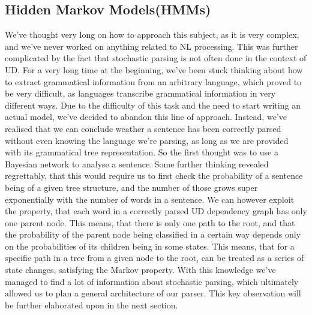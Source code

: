 \subsection{Hidden Markov Models(HMMs)}
We've thought very long on
how to approach this subject, as it is very complex, and we've never worked on anything related to NL processing. This was further
complicated by the fact that stochastic parsing is not often done in the context of UD. For a very long time at the beginning, we've been stuck thinking about how to
extract grammatical information from an arbitrary language, which proved to be very difficult, as languages transcribe grammatical information
in very different ways. Due to the difficulty of this task and the need to start writing an actual model, we've decided to abandon this line of approach.
Instead, we've realised that we can conclude weather a sentence has been correctly parsed without even knowing the language we're parsing, as long as we
are provided with its grammatical tree representation. So the first thought was to use a Bayesian network to analyse a sentence. Some further thinking revealed
regrettably, that this would require us to first check the probability of a sentence being of a given tree structure, and the number of those grows super exponentially
with the number of words in a sentence. We can however exploit the property, that each word in a correctly parsed UD dependency graph has only one parent node. This means, that there is only one path to the root, and that the probability of the parent node being classified in a certain way depends only on the probabilities of its children being in some states. This means, that for a specific path in a tree from a given node to the root, can be treated as a series of state changes, satisfying the Markov property. With this knowledge we've managed to find a lot of information about stochastic parsing, which ultimately allowed us to plan a general architecture of our parser. This key observation will be further elaborated upon in the next section.
